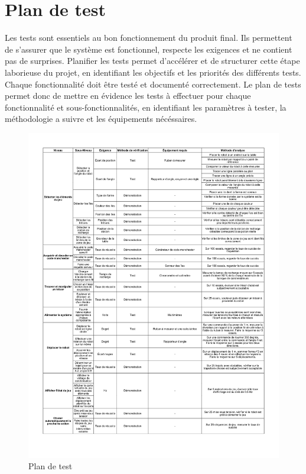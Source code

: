 \chapter{Plan de test}

Les tests sont essentiels au bon fonctionnement du produit final. Ils permettent de s'assurer que le système est fonctionnel,
respecte les exigences et ne contient pas de surprises.
Planifier les tests permet d'accélérer et de structurer cette étape laborieuse du projet, en identifiant les objectifs et les priorités des différents tests.
Chaque fonctionnalité doit être testé et documenté correctement. Le plan de tests permet donc de mettre en évidence les tests à effectuer pour chaque fonctionnalité et sous-fonctionnalités,
en identifiant les paramètres à tester, la méthodologie a suivre et les équipements nécéssaires.

\begin{figure}
  \centering
  \includegraphics[scale=0.75, angle=0]{resources/tests.pdf}
  \caption{Plan de test}
\end{figure}
